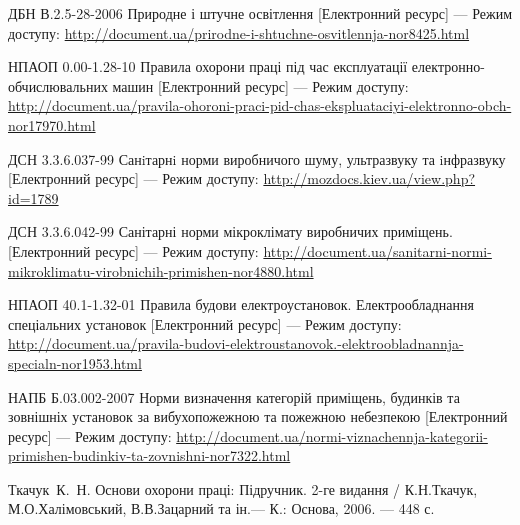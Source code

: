 \documentclass{thesis_utf8}
\begin{document}
\begin{thebibliography}


     ДБН В.2.5-28-2006 Природне і штучне освітлення  [Електронний ресурс] --- Режим доступу:
    \url{http://document.ua/prirodne-i-shtuchne-osvitlennja-nor8425.html}

     НПАОП 0.00-1.28-10 Правила охорони праці під час експлуатації електронно-обчислювальних машин [Електронний ресурс] --- Режим доступу:
    \url{http://document.ua/pravila-ohoroni-praci-pid-chas-ekspluataciyi-elektronno-obch-nor17970.html}

     ДСН 3.3.6.037-99 Санiтарнi норми виробничого шуму, ультразвуку та iнфразвуку [Електронний ресурс]  --- Режим доступу:
    \url{http://mozdocs.kiev.ua/view.php?id=1789}

     ДСН 3.3.6.042-99 Санітарні норми мікроклімату виробничих приміщень. [Електронний ресурс] --- Режим доступу:
    \url{http://document.ua/sanitarni-normi-mikroklimatu-virobnichih-primishen-nor4880.html}

     НПАОП 40.1-1.32-01 Правила будови електроустановок. Електрообладнання спеціальних установок [Електронний ресурс] --- Режим доступу:
    \url{http://document.ua/pravila-budovi-elektroustanovok.-elektroobladnannja-specialn-nor1953.html}

     НАПБ Б.03.002-2007 Норми визначення категорій приміщень, будинків та зовнішніх установок за вибухопожежною та пожежною небезпекою [Електронний ресурс] --- Режим доступу:
    \url{http://document.ua/normi-viznachennja-kategorii-primishen-budinkiv-ta-zovnishni-nor7322.html}

     Ткачук~К.~Н. Основи охорони праці: Підручник. 2-ге видання / К.Н.Ткачук, М.О.Халімовський, В.В.Зацарний та ін.--- К.: Основа, 2006. --- 448 с.


\end{thebibliography}
\end{document}
